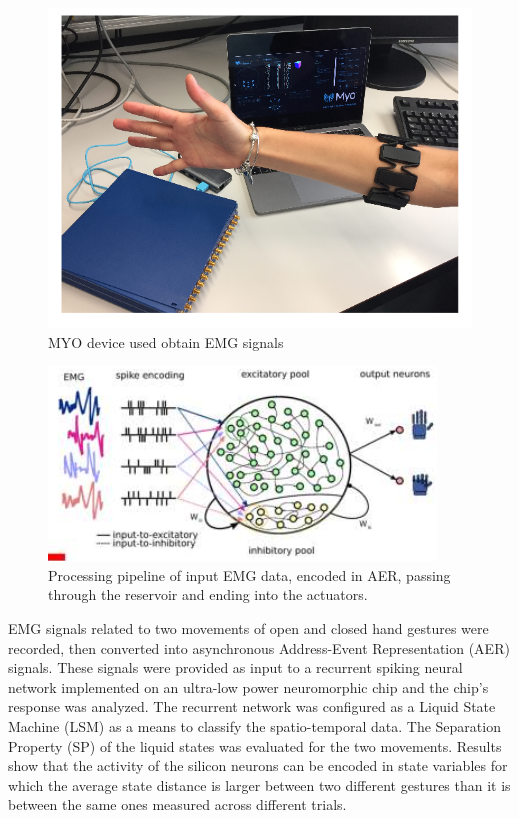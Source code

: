 \documentclass[main]{subfiles}
\begin{document}
%
\begin{figure}[h]
    \centering
    \includegraphics[width=0.8\linewidth]{12_NeuromorphicSystems2/figures/myo.PNG}
    \caption{MYO device used obtain EMG signals}
    \label{fig:myo}
\end{figure}
%

%
\begin{figure}[h]
    \centering
    \includegraphics[width=0.8\linewidth]{12_NeuromorphicSystems2/figures/stages.PNG}
    \caption{Processing pipeline of input EMG data, encoded in AER, passing through the reservoir and ending into the actuators.}
    \label{fig:stage}
\end{figure}
%

EMG signals related to two movements of open and closed hand gestures were recorded, then converted into asynchronous Address-Event Representation (AER) signals. These signals were provided as input to a recurrent spiking neural network implemented on an ultra-low power neuromorphic chip and the chip’s  response was analyzed. The  recurrent network was configured as a Liquid State Machine (LSM) as a means to classify the spatio-temporal data. The Separation Property (SP) of the liquid  states was evaluated for the  two  movements. Results show that the activity of the silicon neurons can be encoded in state variables for which the average state distance is larger between two different gestures than it is between the same ones measured across different trials.
\end{document}
